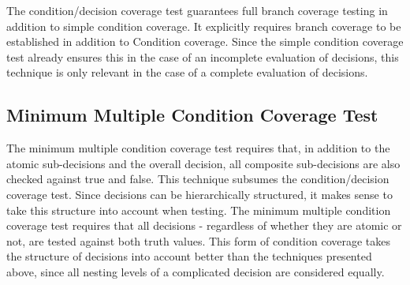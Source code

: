 	The condition/decision coverage test guarantees full branch coverage testing in addition to simple condition coverage. It explicitly requires branch coverage to be established in addition to Condition coverage. Since the simple condition coverage test already ensures this in the case of an incomplete evaluation of decisions, this technique is only relevant in the case of a complete evaluation of decisions. %


	\subsection{Minimum Multiple Condition Coverage Test}
	The minimum multiple condition coverage test requires that, in addition to the atomic sub-decisions and the overall decision, all composite sub-decisions are also checked against true and false. This technique subsumes the condition/decision coverage test. Since decisions can be hierarchically structured, it makes sense to take this structure into account when testing. The minimum multiple condition coverage test requires that all decisions - regardless of whether they are atomic or not, are tested against both truth values. This form of condition coverage takes the structure of decisions into account better than the techniques presented above, since all nesting levels of a complicated decision are considered equally.

